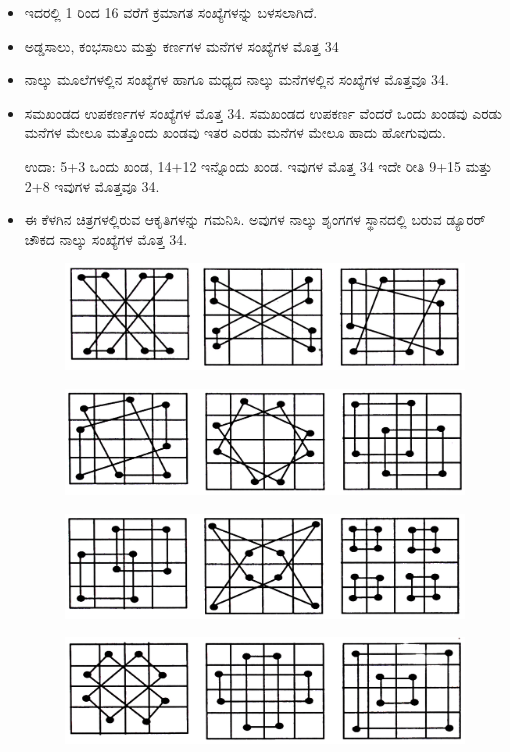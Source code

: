 \begin{itemize}
	\item ಇದರಲ್ಲಿ 1 ರಿಂದ 16 ವರೆಗೆ ಕ್ರಮಾಗತ ಸಂಖ್ಯೆಗಳನ್ನು ಬಳಸಲಾಗಿದೆ.
	\item ಅಡ್ಡಸಾಲು, ಕಂಭಸಾಲು ಮತ್ತು ಕರ್ಣಗಳ ಮನೆಗಳ ಸಂಖ್ಯೆಗಳ ಮೊತ್ತ 34
	\item ನಾಲ್ಕು ಮೂಲೆಗಳಲ್ಲಿನ ಸಂಖ್ಯೆಗಳ ಹಾಗೂ ಮಧ್ಯದ ನಾಲ್ಕು ಮನೆಗಳಲ್ಲಿನ ಸಂಖ್ಯೆಗಳ ಮೊತ್ತವೂ 34.
	\item ಸಮಖಂಡದ ಉಪಕರ್ಣಗಳ ಸಂಖ್ಯೆಗಳ ಮೊತ್ತ 34. ಸಮಖಂಡದ ಉಪಕರ್ಣ ವೆಂದರೆ ಒಂದು ಖಂಡವು ಎರಡು ಮನೆಗಳ ಮೇಲೂ ಮತ್ತೊಂದು ಖಂಡವು ಇತರ ಎರಡು ಮನೆಗಳ ಮೇಲೂ ಹಾದು ಹೋಗುವುದು.

	ಉದಾ: 5+3 ಒಂದು ಖಂಡ, 14+12 ಇನ್ನೊಂದು ಖಂಡ. ಇವುಗಳ ಮೊತ್ತ 34 ಇದೇ ರೀತಿ 9+15 ಮತ್ತು 2+8 ಇವುಗಳ ಮೊತ್ತವೂ 34.
	\item ಈ ಕೆಳಗಿನ ಚಿತ್ರಗಳಲ್ಲಿರುವ ಆಕೃತಿಗಳನ್ನು ಗಮನಿಸಿ. ಅವುಗಳ ನಾಲ್ಕು ಶೃಂಗಗಳ ಸ್ಥಾನದಲ್ಲಿ ಬರುವ ಡ್ಯೂರರ್ ಚೌಕದ ನಾಲ್ಕು ಸಂಖ್ಯೆಗಳ ಮೊತ್ತ 34.
	\begin{figure}[h]
	\includegraphics{src/figures/chap4/fig4.16.jpg}
	\end{figure}
	\begin{figure}[h]
	\includegraphics{src/figures/chap4/fig4.17.jpg}
	\end{figure}
	\begin{figure}[h]
	\includegraphics{src/figures/chap4/fig4.18.jpg}
	\end{figure}
	\begin{figure}[h]
	\includegraphics{src/figures/chap4/fig4.19.jpg}
	\end{figure}


\end{itemize}
